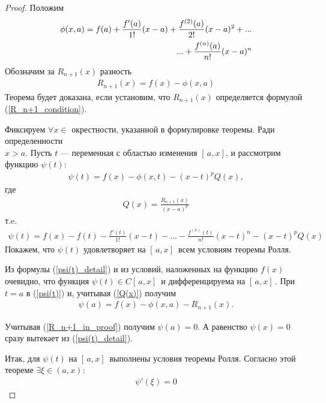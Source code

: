 \begin{proof}
    Положим
    \begin{align}
        \phi(x,a) = f(a) + \frac{f'(a)}{1!}(x-a) + \frac{f^{(2)}(a)}{2!}(x-a)^2 + ... \notag \\
        ... + \frac{f^{(n)}(a)}{n!}(x-a)^n
    \end{align}
    Обозначим за $R_{n+1}(x)$ разность
    \begin{align}\label{R_n+1_in_proof}
        R_{n+1}(x) = f(x) - \phi(x,a)
    \end{align}
    Теорема будет доказана, если установим, что $R_{n+1}(x)$ определяется формулой (\ref{R_n+1_condition}).

    Фиксируем $\forall x \in$ окрестности, указанной в формулировке теоремы. Ради определенности \\ \mathLet $x>a$. Пусть $t$ --- переменная с областью изменения $[\,a, x]$, и рассмотрим функцию $\psi(t)$:
    \begin{align}\label{psi(t)}
        \psi(t) = f(x) - \phi(x,t) - (x-t)^pQ(x),
    \end{align}
    где
    \begin{align}\label{Q(x)}
        Q(x) = \frac{R_{n+1}(x)}{(x-a)^p}
    \end{align}
    т.e.
    \begin{align}\label{psi(t)_detail}
        \psi(t) = f(x) - f(t) - \frac{f'(t)}{1!}(x-t) - ... - \frac{f^{(n)}(t)}{n!}(x-t)^n - (x-t)^pQ(x)
    \end{align}
    Покажем, что $\psi(t)$ удовлетворяет на $[\,a,x]\,$ всем условиям теоремы Ролля.

    Из формулы (\ref{psi(t)_detail}) и из условий, наложенных на функцию $f(x)$ очевидно, что функция $\psi(t) \in C[\,a,x]\,$ и дифференцируема на $[\,a,x]\,$. При $t=a$ в (\ref{psi(t)}) и, учитывая (\ref{Q(x)}) получим
    \begin{align*}
        \psi(a) = f(x) - \phi(x,a) - R_{n+1}(x).
    \end{align*}

    Учитывая (\ref{R_n+1_in_proof}) получим $\psi(a) = 0$. А равенство $\psi(x) = 0$ сразу вытекает из (\ref{psi(t)_detail}).
    \bigbreak

    Итак, для $\psi(t)$ на  $[\,a,x]\,$ выполнены условия теоремы Ролля. Согласно этой теореме $\exists \xi \in (a,x): $
    \begin{align}\label{psi'(xi)}
        \psi'(\xi)=0
    \end{align}


\end{proof}
